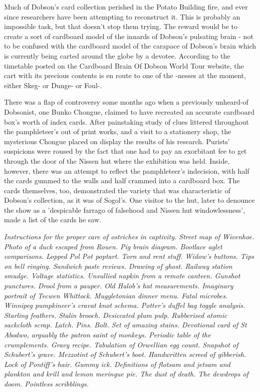 Much of Dobson's card collection perished in the Potato Building fire, and ever since researchers have been attempting to reconstruct it. This is probably an impossible task, but that doesn't stop them trying. The reward would be to create a sort of cardboard model of the innards of Dobson's pulsating brain - not to be confused with the cardboard model of the carapace of Dobson's brain which is currently being carted around the globe by a devotee. According to the timetable posted on the Cardboard Brain Of Dobson World Tour website, the cart with its precious contents is en route to one of the -nesses at the moment, either Skeg- or Dunge- or Foul-.

There was a flap of controversy some months ago when a previously unheard-of Dobsonist, one Bunko Chongue, claimed to have recreated an accurate cardboard box's worth of index cards. After painstaking study of clues littered throughout the pamphleteer's out of print works, and a visit to a stationery shop, the mysterious Chongue placed on display the results of his research. Purists' suspicions were roused by the fact that one had to pay an exorbitant fee to get through the door of the Nissen hut where the exhibition was held. Inside, however, there was an attempt to reflect the pamphleteer's indecision, with half the cards gummed to the walls and half crammed into a cardboard box. The cards themselves, too, demonstrated the variety that was characteristic of Dobson's collection, as it was of Sogol's. One visitor to the hut, later to denounce the show as a 'despicable farrago of falsehood and Nissen hut windowlessness', made a list of the cards he saw.

\emph{Instructions for the proper care of ostriches in captivity. Street map of Wivenhoe. Photo of a duck escaped from Rouen. Pig brain diagram. Bootlace aglet comparisons. Lopped Pol Pot poptart. Torn and rent stuff. Widow's buttons. Tips on bell ringing. Sandwich paste reviews. Drawing of ghost. Railway station smudge. Voltage statistics. Unsullied napkin from a remote canteen. Gunshot punctures. Drool from a pauper. Old Halob's hat measurements. Imaginary portrait of Tecwen Whittock. Muggletonian dinner menu. Fatal microbes. Winnipeg pumpkineer's cravat knot schema. Potter's duffel bag toggle analysis. Starling feathers. Stalin brooch. Desiccated plum pulp. Rubberised atomic sackcloth scrap. Latch. Pins. Bolt. Set of amazing stains. Devotional card of St Abodwo, arguably the patron saint of monkeys. Periodic table of the crumplements. Gravy recipe. Tabulation of Orwellian egg count. Snapshot of Schubert's grave. Mezzotint of Schubert's boot. Handwritten screed of gibberish. Lock of Pontiff's hair. Gummy ick. Definitions of flotsam and jetsam and plankton and krill and lemon meringue pie. The dust of death. The dewdrops of doom. Pointless scribblings.}

